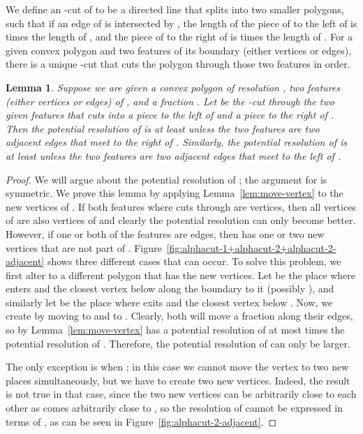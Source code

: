 \documentclass[11pt]{article}
\newtheorem {lemma} {Lemma}
\begin{document}
    We define an -cut of  to be a directed line  that splits 
    into two smaller polygons, such that if an edge  of  is intersected by , the length of the piece of  to the left of  is  times
    the length of , and the piece of  to the right of  is 
    times the length of .
    For a given convex polygon and two features of its boundary (either vertices
    or edges), there is a unique -cut that cuts the polygon through those
    two features in order.

    \begin {lemma} \label {lem:alphacut}
      Suppose we are
      given a convex polygon  of resolution , two features (either vertices
      or edges) of , and a fraction .
      Let  be the -cut through the two given features that cuts 
      into a piece  to the left of  and a piece  to the right of .
      Then the potential resolution of  is at least  unless the two
      features are two adjacent edges that meet to the right of .
      Similarly, the potential resolution of  is at least 
      unless the two features are two adjacent edges that meet to the left of .
    \end {lemma}

    \begin {proof}
      We will argue about the potential resolution of ; the argument for  is symmetric.
      We prove this lemma by applying Lemma~\ref {lem:move-vertex} to the
      new vertices of . If both features where  cuts through  are
      vertices, then all vertices of  are also vertices of  and clearly
      the potential resolution can only become better. However, if one or both of
      the features are edges, then  has one or two new vertices that are not
      part of .
      Figure~\ref {fig:alphacut-1+alphacut-2+alphacut-2-adjacent} shows three different cases that can occur.
      To solve this problem, we first alter  to a different
      polygon  that has the new vertices. Let  be the place where 
      enters  and  the closest vertex below  along the boundary to it
      (possibly ), and similarly let  be the place where  exits
       and  the closest vertex below . Now, we create  by moving
       to  and  to . Clearly, both will move a fraction 
      along their edges, so by Lemma~\ref {lem:move-vertex}  has a potential
      resolution of at most  times the potential resolution of .
      Therefore, the potential resolution of  can only be larger.

      The only exception is when ; in this case we cannot move the vertex
      to two new places simultaneously, but we have to create two new vertices.
      Indeed, the result is not true in that case, since the two new vertices
      can be arbitrarily close to each other as  comes arbitrarily
      close to , so the resolution of  cannot be expressed in terms of
      , as can be seen in Figure~\ref {fig:alphacut-2-adjacent}.
    \end {proof}
\end{document}
